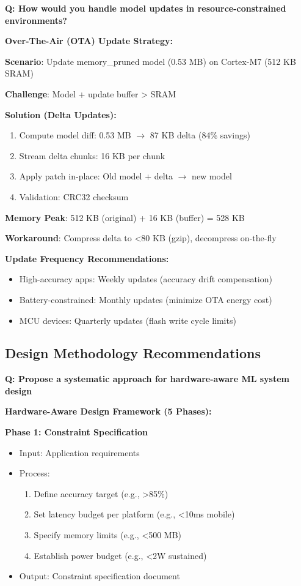 \documentclass[10pt, a4paper]{article}
\begin{document}
\textbf{Q: How would you handle model updates in resource-constrained environments?}

\textbf{Over-The-Air (OTA) Update Strategy:}

\textbf{Scenario}: Update memory\_pruned model (0.53 MB) on Cortex-M7 (512 KB SRAM)

\textbf{Challenge}: Model + update buffer > SRAM

\textbf{Solution (Delta Updates):}
\begin{enumerate}
    \item Compute model diff: 0.53 MB $\rightarrow$ 87 KB delta (84\% savings)
    \item Stream delta chunks: 16 KB per chunk
    \item Apply patch in-place: Old model + delta $\rightarrow$ new model
    \item Validation: CRC32 checksum
\end{enumerate}

\textbf{Memory Peak}: 512 KB (original) + 16 KB (buffer) = 528 KB

\textbf{Workaround}: Compress delta to <80 KB (gzip), decompress on-the-fly

\textbf{Update Frequency Recommendations:}
\begin{itemize}
    \item High-accuracy apps: Weekly updates (accuracy drift compensation)
    \item Battery-constrained: Monthly updates (minimize OTA energy cost)
    \item MCU devices: Quarterly updates (flash write cycle limits)
\end{itemize}

\subsection{Design Methodology Recommendations}

\textbf{Q: Propose a systematic approach for hardware-aware ML system design}

\textbf{Hardware-Aware Design Framework (5 Phases):}

\textbf{Phase 1: Constraint Specification}
\begin{itemize}
    \item Input: Application requirements
    \item Process:
    \begin{enumerate}
        \item Define accuracy target (e.g., >85\%)
        \item Set latency budget per platform (e.g., <10ms mobile)
        \item Specify memory limits (e.g., <500 MB)
        \item Establish power budget (e.g., <2W sustained)
    \end{enumerate}
    \item Output: Constraint specification document
\end{itemize}
\end{document}
